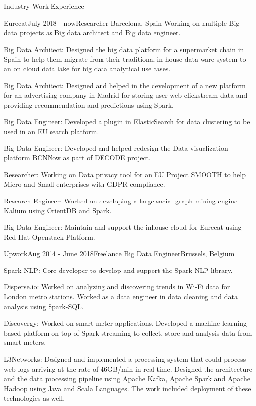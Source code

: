 \documentclass{resume} %
\begin{document}

\begin{rSection}{Industry Work Experience}
\begin{rSubsection}{Eurecat}{July 2018 - now}{Researcher}{ Barcelona, Spain}
Working on multiple Big data projects as Big data architect and Big data engineer.
\item Big Data Architect: Designed the big data platform for a supermarket chain in Spain to help them migrate from their traditional in house data ware system to an on cloud data lake for big data analytical use cases.
\item Big Data Architect: Designed and helped in the development of a new platform for an advertising company in Madrid for storing user web clickstream data and providing recommendation and predictions using Spark.
\item Big Data Engineer: Developed a plugin in ElasticSearch for data clustering to be used in an EU search platform.
\item Big Data Engineer: Developed and helped redesign the Data visualization platform BCNNow as part of DECODE project.
\item Researcher: Working on Data privacy tool for an EU Project SMOOTH to help Micro and Small enterprises with GDPR compliance.
\item Research Engineer: Worked on developing a large social graph mining engine Kalium using OrientDB and Spark.
\item Big Data Engineer: Maintain and support the inhouse cloud for Eurecat using Red Hat Openstack Platform.
\end{rSubsection}
\begin{rSubsection}{Upwork}{Aug 2014 - June 2018}{Freelance Big Data Engineer}{Brussels, Belgium}
\item Spark NLP: Core developer to develop and support the Spark NLP library.\item Disperse.io: Worked on analyzing and discovering trends in Wi-Fi data for London metro stations. Worked as a data engineer in data cleaning and data analysis using Spark-SQL.
\item Discovergy: Worked on smart meter applications. Developed a machine learning based platform on top of Spark streaming to collect, store and analysis data from smart meters. 
\item L3Networks: Designed and implemented a processing system that could process web logs arriving at the rate of 46GB/min in real-time. Designed the architecture and the data processing pipeline using Apache Kafka, Apache Spark and Apache Hadoop using Java and Scala Languages. The work included deployment of these technologies as well.

\end{rSubsection}
\end{rSection}
\end{document}
